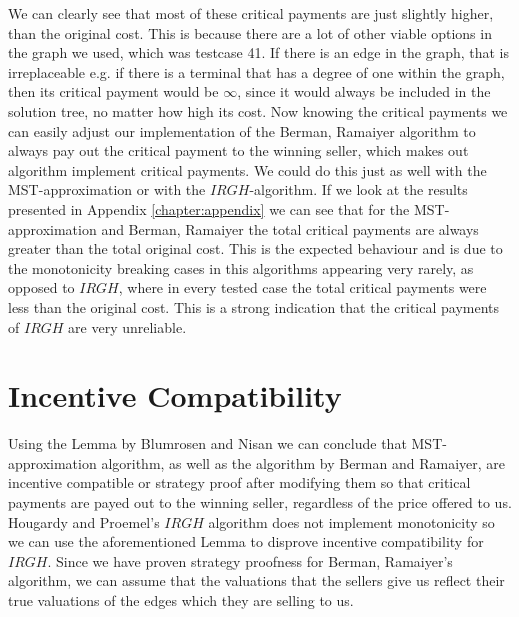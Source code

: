 We can clearly see that most of these critical payments are just slightly higher, than the original cost. This is because there are a lot of other viable options in the graph we used, which was testcase 41. If there is an edge in the graph, that is irreplaceable e.g. if there is a terminal that has a degree of one within the graph, then its critical payment would be $\infty$, since it would always be included in the solution tree, no matter how high its cost. Now knowing the critical payments we can easily adjust our implementation of the Berman, Ramaiyer algorithm to always pay out the critical payment to the winning seller, which makes out algorithm implement critical payments. We could do this just as well with the MST-approximation or with the $IRGH$-algorithm. If we look at the results presented in Appendix \ref{chapter:appendix} we can see that for the MST-approximation and Berman, Ramaiyer the total critical payments are always greater than the total original cost. This is the expected behaviour and is due to the monotonicity breaking cases in this algorithms appearing very rarely, as opposed to $IRGH$, where in every tested case the total critical payments were less than the original cost. This is a strong indication that the critical payments of $IRGH$ are very unreliable.


\section{Incentive Compatibility}

Using the Lemma by Blumrosen and Nisan \cite{BlNi07} we can conclude that MST-approximation algorithm, as well as the algorithm by Berman and Ramaiyer, are incentive compatible or strategy proof after modifying them so that critical payments are payed out to the winning seller, regardless of the price offered to us. Hougardy and Proemel's $IRGH$ algorithm does not implement monotonicity so we can use the aforementioned Lemma to disprove incentive compatibility for $IRGH$. Since we have proven strategy proofness for Berman, Ramaiyer's algorithm, we can assume that the valuations that the sellers give us reflect their true valuations of the edges which they are selling to us. 